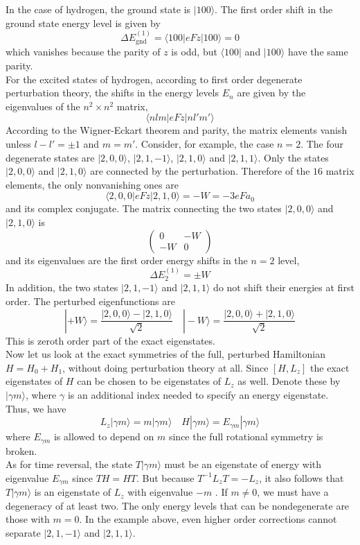\documentclass[cyan]{elegantnote}
\begin{document}
In the case of hydrogen, the ground state is $|100\rangle$. The first order shift in the ground state energy level is given by
\[\Delta E^{(1)}_{\mathrm{gnd}} = \langle 100 | eFz | 100\rangle = 0\]
which vanishes because the parity of $z$ is odd, but $\langle 100 |$ and $| 100\rangle$ have the same parity.\\
For the excited states of hydrogen, according to first order degenerate perturbation theory, the shifts in the energy levels $E_n$ are given by the eigenvalues of the $n^2\times n^2$ matrix,
\[\langle nlm | eFz | nl'm'\rangle\]
According to the Wigner-Eckart theorem and parity, the matrix elements vanish unless $l -l' = \pm 1$ and $m = m'$. Consider, for example, the case $n=2$. The four degenerate states are  $|2,0,0\rangle$, $|2,1,-1\rangle$, $|2,1,0\rangle$ and $|2,1,1\rangle$. Only the states $|2,0,0\rangle$ and $|2,1,0\rangle$ are connected by the perturbation. Therefore of the $16$ matrix elements, the only nonvanishing ones are
\[\langle 2,0,0 | eFz | 2,1,0\rangle = -W = -3eFa_0\]
and its complex conjugate. The matrix connecting the two states $|2,0,0\rangle$ and $|2,1,0\rangle$ is
\[\begin{pmatrix}0 & -W \\ -W & 0\end{pmatrix} \]
and its eigenvalues are the first order energy shifts in the $n=2$ level,
\[\Delta E_2^{(1)} = \pm W\]
In addition, the two states $|2,1,-1\rangle$ and $|2,1,1\rangle$ do not shift their energies at first order. The perturbed eigenfunctions are
\[|+W\rangle = \frac{|2,0,0\rangle - |2,1,0\rangle}{\sqrt{2}} \quad |-W\rangle = \frac{|2,0,0\rangle + |2,1,0\rangle}{\sqrt{2}}\]
This is zeroth order part of the exact eigenstates.\\
Now let us look at the exact symmetries of the full, perturbed Hamiltonian $ H = H_0 + H_1$, without doing perturbation theory at all. Since $[H,L_z]$ the exact eigenstates of $H$ can be chosen to be eigenstates of $L_z$ as well.
Denote these by $|\gamma m \rangle$, where $\gamma$ is an additional index needed to specify an energy
eigenstate. Thus, we have
\[L_z |\gamma m \rangle = m |\gamma m \rangle \quad H |\gamma m \rangle = E_{\gamma m} |\gamma m \rangle\]
where $E_{\gamma m}$ is allowed to depend on $m$ since the full rotational symmetry is broken. \\
As for time reversal, the state $T|\gamma m\rangle$ must be an eigenstate of energy with eigenvalue $E_{\gamma m}$ since $TH = HT$. But because $T^{-1}L_zT = -L_z$, it also follows that $T|\gamma m\rangle$ is an eigenstate of $L_z$ with eigenvalue $-m$ . If $m \neq 0$, we must have a degeneracy of at least two. 
The only energy levels that can be nondegenerate are those with $m=0$. In the example above, even higher order corrections cannot separate $|2,1,-1\rangle$ and $|2,1,1\rangle$.
\end{document}
